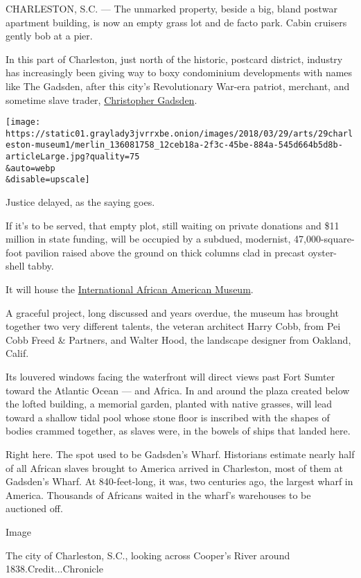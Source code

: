 CHARLESTON, S.C. --- The unmarked property, beside a big, bland postwar
apartment building, is now an empty grass lot and de facto park. Cabin
cruisers gently bob at a pier.

In this part of Charleston, just north of the historic, postcard
district, industry has increasingly been giving way to boxy condominium
developments with names like The Gadsden, after this city's
Revolutionary War-era patriot, merchant, and sometime slave trader,
\href{http://teachingushistory.org/lessons/Gadsden.htm}{Christopher
Gadsden}.

\texttt{[image: https://static01.graylady3jvrrxbe.onion/images/2018/03/29/arts/29charleston-museum1/merlin\_136081758\_12ceb18a-2f3c-45be-884a-545d664b5d8b-articleLarge.jpg?quality=75\\\&auto=webp\\\&disable=upscale]}

Justice delayed, as the saying goes.

If it's to be served, that empty plot, still waiting on private
donations and \$11 million in state funding, will be occupied by a
subdued, modernist, 47,000-square-foot pavilion raised above the ground
on thick columns clad in precast oyster-shell tabby.

It will house the \href{https://iaamuseum.org/}{International African
American Museum}.

A graceful project, long discussed and years overdue, the museum has
brought together two very different talents, the veteran architect Harry
Cobb, from Pei Cobb Freed \& Partners, and Walter Hood, the landscape
designer from Oakland, Calif.

Its louvered windows facing the waterfront will direct views past Fort
Sumter toward the Atlantic Ocean --- and Africa. In and around the plaza
created below the lofted building, a memorial garden, planted with
native grasses, will lead toward a shallow tidal pool whose stone floor
is inscribed with the shapes of bodies crammed together, as slaves were,
in the bowels of ships that landed here.

Right here. The spot used to be Gadsden's Wharf. Historians estimate
nearly half of all African slaves brought to America arrived in
Charleston, most of them at Gadsden's Wharf. At 840-feet-long, it was,
two centuries ago, the largest wharf in America. Thousands of Africans
waited in the wharf's warehouses to be auctioned off.

Image

The city of Charleston, S.C., looking across Cooper's River around
1838.Credit...Chronicle

